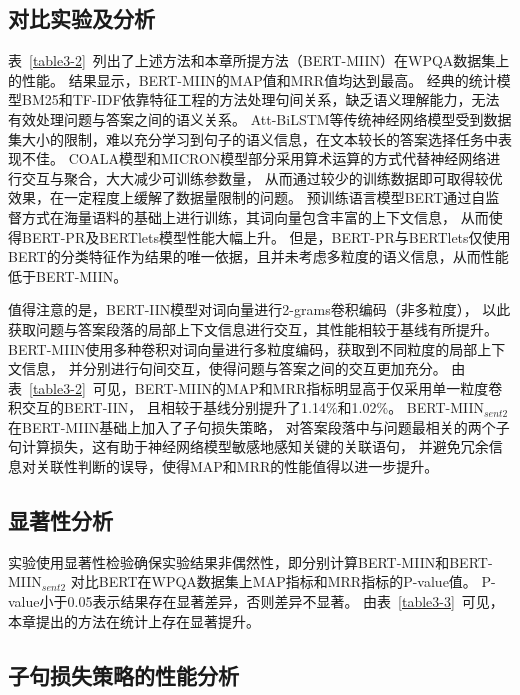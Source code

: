 \subsection{对比实验及分析}

表~\ref{table3-2}~列出了上述方法和本章所提方法（BERT-MIIN）在WPQA数据集上的性能。
结果显示，BERT-MIIN的MAP值和MRR值均达到最高。
经典的统计模型BM25和TF-IDF依靠特征工程的方法处理句间关系，缺乏语义理解能力，无法有效处理问题与答案之间的语义关系。
Att-BiLSTM等传统神经网络模型受到数据集大小的限制，难以充分学习到句子的语义信息，在文本较长的答案选择任务中表现不佳。
COALA模型和MICRON模型部分采用算术运算的方式代替神经网络进行交互与聚合，大大减少可训练参数量，
从而通过较少的训练数据即可取得较优效果，在一定程度上缓解了数据量限制的问题。
预训练语言模型BERT通过自监督方式在海量语料的基础上进行训练，其词向量包含丰富的上下文信息，
从而使得BERT-PR及BERTlets模型性能大幅上升。
但是，BERT-PR与BERTlets仅使用BERT的分类特征作为结果的唯一依据，且并未考虑多粒度的语义信息，从而性能低于BERT-MIIN。



值得注意的是，BERT-IIN模型对词向量进行2-grams卷积编码（非多粒度），
以此获取问题与答案段落的局部上下文信息进行交互，其性能相较于基线有所提升。
BERT-MIIN使用多种卷积对词向量进行多粒度编码，获取到不同粒度的局部上下文信息，
并分别进行句间交互，使得问题与答案之间的交互更加充分。
由表~\ref{table3-2}~可见，BERT-MIIN的MAP和MRR指标明显高于仅采用单一粒度卷积交互的BERT-IIN，
且相较于基线分别提升了1.14\%和1.02\%。
BERT-MIIN$_{sent2}$在BERT-MIIN基础上加入了子句损失策略，
对答案段落中与问题最相关的两个子句计算损失，这有助于神经网络模型敏感地感知关键的关联语句，
并避免冗余信息对关联性判断的误导，使得MAP和MRR的性能值得以进一步提升。



\subsection{显著性分析}

实验使用显著性检验确保实验结果非偶然性，即分别计算BERT-MIIN和BERT-MIIN$_{sent2}$
对比BERT在WPQA数据集上MAP指标和MRR指标的P-value值。
P-value小于0.05表示结果存在显著差异，否则差异不显著。
由表~\ref{table3-3}~可见，本章提出的方法在统计上存在显著提升。



\subsection{子句损失策略的性能分析}


